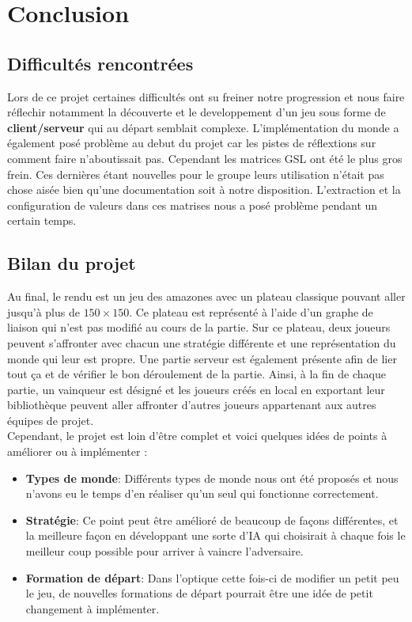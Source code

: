 \chapter{Conclusion}

\section{Difficultés rencontrées}

Lors de ce projet certaines difficultés ont su freiner notre progression et nous faire réflechir notamment la découverte et le developpement d'un jeu sous forme de \textbf{client/serveur} qui au départ semblait complexe. L'implémentation du monde a également posé problème au debut du projet car les pistes de réflextions sur comment faire n'aboutissait pas. Cependant les matrices GSL ont été le plus gros frein. Ces dernières étant nouvelles pour le groupe leurs utilisation n'était pas chose aisée bien qu'une documentation soit à notre disposition. L'extraction et la configuration de valeurs dans ces matrises nous a posé problème pendant un certain temps.    

\section{Bilan du projet}
Au final, le rendu est un jeu  des amazones avec un plateau classique pouvant aller jusqu'à plus de $150 \times 150$. Ce plateau est représenté à l'aide d'un graphe de liaison qui n'est pas modifié au cours de la partie. Sur ce plateau, deux joueurs peuvent s'affronter avec chacun une stratégie différente et une représentation du monde qui leur est propre. Une partie serveur est également présente afin de lier tout ça et de vérifier le bon déroulement de la partie. Ainsi, à la fin de chaque partie, un vainqueur est désigné et les joueurs créés en local en exportant leur bibliothèque peuvent aller affronter d'autres joueurs appartenant aux autres équipes de projet. 
\\
Cependant, le projet est loin d'être complet et voici quelques idées de points à améliorer ou à implémenter :
\medbreak
\begin{itemize}
    \item \textbf{Types de monde}: Différents types de monde nous ont été proposés et nous n'avons eu le temps d'en réaliser qu'un seul qui fonctionne correctement.
    \item \textbf{Stratégie}: Ce point peut être amélioré de beaucoup de façons différentes, et la meilleure façon en développant une sorte d'IA qui choisirait à chaque fois le meilleur coup possible pour arriver à vaincre l'adversaire.
    \item \textbf{Formation de départ}: Dans l'optique cette fois-ci de modifier un petit peu le jeu, de nouvelles formations de départ pourrait être une idée de petit changement à implémenter.
\end{itemize}

